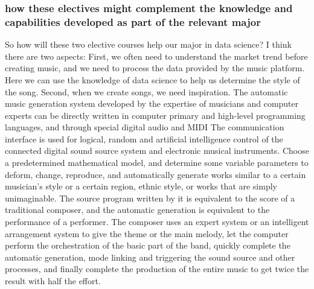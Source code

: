 \documentclass[../draft.tex]{subfiles}
\begin{document}
\subsubsection{how these electives might complement the knowledge and capabilities developed as part of the relevant major}
So how will these two elective courses help our major in data science? I think there are two aspects: First, we often need to understand the market trend before creating music, and we need to process the data provided by the music platform. Here we can use the knowledge of data science to help us determine the style of the song. Second, when we create songs, we need inspiration. The automatic music generation system developed by the expertise of musicians and computer experts can be directly written in computer primary and high-level programming languages, and through special digital audio and MIDI The communication interface is used for logical, random and artificial intelligence control of the connected digital sound source system and electronic musical instruments. Choose a predetermined mathematical model, and determine some variable parameters to deform, change, reproduce, and automatically generate works similar to a certain musician's style or a certain region, ethnic style, or works that are simply unimaginable. The source program written by it is equivalent to the score of a traditional composer, and the automatic generation is equivalent to the performance of a performer. The composer uses an expert system or an intelligent arrangement system to give the theme or the main melody, let the computer perform the orchestration of the basic part of the band, quickly complete the automatic generation, mode linking and triggering the sound source and other processes, and finally complete the production of the entire music to get twice the result with half the effort. 
\end{document}
